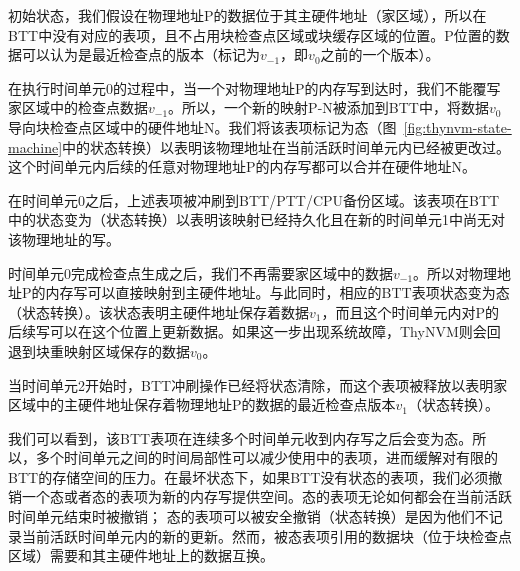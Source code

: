 \vspace{\noindentsep}
\noindent{} 初始状态，我们假设在物理地址P的数据位于其主硬件地址（家区域），所以在BTT中没有对应的表项，且不占用块检查点区域或块缓存区域的位置。P位置的数据可以认为是最近检查点的版本（标记为$v_{-1}$，即$v_0$之前的一个版本）。

\vspace{\noindentsep}
\noindent{} 在执行时间单元0的过程中，当一个对物理地址P的内存写到达时，我们不能覆写家区域中的检查点数据$v_{-1}$。所以，一个新的映射P-N被添加到BTT中，将数据$v_0$导向块检查点区域中的硬件地址N。我们将该表项标记为态（图~\ref{fig:thynvm-state-machine}中的状态转换）以表明该物理地址在当前活跃时间单元内已经被更改过。这个时间单元内后续的任意对物理地址P的内存写都可以合并在硬件地址N。

\vspace{\noindentsep}
\noindent{} 在时间单元0之后，上述表项被冲刷到BTT/PTT/CPU备份区域。该表项在BTT中的状态变为（状态转换）以表明该映射已经持久化且在新的时间单元1中尚无对该物理地址的写。

\vspace{\noindentsep}
\noindent{} 时间单元0完成检查点生成之后，我们不再需要家区域中的数据$v_{-1}$。所以对物理地址P的内存写可以直接映射到主硬件地址。与此同时，相应的BTT表项状态变为态（状态转换）。该状态表明主硬件地址保存着数据$v_1$，而且这个时间单元内对P的后续写可以在这个位置上更新数据。如果这一步出现系统故障，ThyNVM则会回退到块重映射区域保存的数据$v_{0}$。

\vspace{\noindentsep}
\noindent{} 当时间单元2开始时，BTT冲刷操作已经将状态清除，而这个表项被释放以表明家区域中的主硬件地址保存着物理地址P的数据的最近检查点版本$v_1$（状态转换）。

我们可以看到，该BTT表项在连续多个时间单元收到内存写之后会变为态。所以，多个时间单元之间的时间局部性可以减少使用中的表项，进而缓解对有限的BTT的存储空间的压力。在最坏状态下，如果BTT没有状态的表项，我们必须撤销一个态或者态的表项为新的内存写提供空间。态的表项无论如何都会在当前活跃时间单元结束时被撤销；
态的表项可以被安全撤销（状态转换）是因为他们不记录当前活跃时间单元内的新的更新。然而，被态表项引用的数据块（位于块检查点区域）需要和其主硬件地址上的数据互换。

